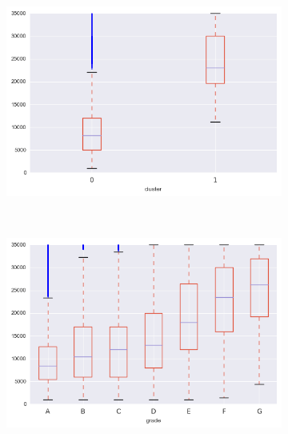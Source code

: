 \begin{anexosenv}
\begin{figure}[t!]
\begin{subfigure}[t]{0.5\textwidth}
            \centerline{\includegraphics[width=1.05\textwidth]{img/loan_amnt_by_cluster}}
        \end{subfigure}%
        ~ 
        \begin{subfigure}[t]{0.5\textwidth}
            \centering
   
            \centerline{\includegraphics[width=1.05\textwidth]{img/loan_amnt_by_grade}}

        \end{subfigure}
\\
                \caption{int\textunderscore rate\textunderscore float}
        \begin{subfigure}[t]{0.5\textwidth}
            \centering


\end{subfigure}
\end{figure}
\end{anexosenv}
